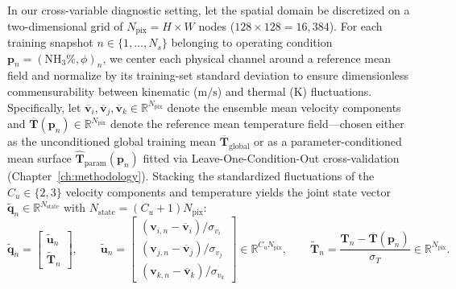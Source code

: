 In our cross-variable diagnostic setting, let the spatial domain be discretized on a two-dimensional grid of $N_{\text{pix}} = H \times W$ nodes ($128 \times 128 = 16{,}384$). For each training snapshot $n \in \{1, \dots, N_s\}$ belonging to operating condition $\mathbf{p}_n = (\text{NH}_3\%, \phi)_n$, we center each physical channel around a reference mean field and normalize by its training-set standard deviation to ensure dimensionless commensurability between kinematic ($\text{m/s}$) and thermal ($\text{K}$) fluctuations. Specifically, let $\overline{\mathbf{v}}_i, \overline{\mathbf{v}}_j, \overline{\mathbf{v}}_k \in \mathbb{R}^{N_{\text{pix}}}$ denote the ensemble mean velocity components and $\overline{\mathbf{T}}(\mathbf{p}_n) \in \mathbb{R}^{N_{\text{pix}}}$ denote the reference mean temperature field---chosen either as the unconditioned global training mean $\overline{\mathbf{T}}_{\text{global}}$ or as a parameter-conditioned mean surface $\hat{\mathbf{T}}_{\text{param}}(\mathbf{p}_n)$ fitted via Leave-One-Condition-Out cross-validation (Chapter~\ref{ch:methodology}). Stacking the standardized fluctuations of the $C_u \in \{2, 3\}$ velocity components and temperature yields the joint state vector $\tilde{\mathbf{q}}_n \in \mathbb{R}^{N_{\text{state}}}$ with $N_{\text{state}} = (C_u + 1) N_{\text{pix}}$:
\begin{equation}
    \tilde{\mathbf{q}}_n = \begin{bmatrix} \tilde{\mathbf{u}}_n \\ \tilde{\mathbf{T}}_n \end{bmatrix}, \qquad \tilde{\mathbf{u}}_n = \begin{bmatrix} (\mathbf{v}_{i,n} - \overline{\mathbf{v}}_i) / \sigma_{v_i} \\ (\mathbf{v}_{j,n} - \overline{\mathbf{v}}_j) / \sigma_{v_j} \\ (\mathbf{v}_{k,n} - \overline{\mathbf{v}}_k) / \sigma_{v_k} \end{bmatrix} \in \mathbb{R}^{C_u N_{\text{pix}}}, \qquad \tilde{\mathbf{T}}_n = \frac{\mathbf{T}_n - \overline{\mathbf{T}}(\mathbf{p}_n)}{\sigma_T} \in \mathbb{R}^{N_{\text{pix}}}.
    \label{eq:bg_joint_snapshot}
\end{equation}

